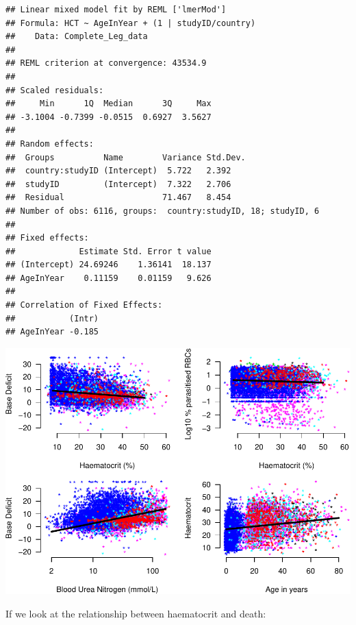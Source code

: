 \documentclass[]{article}
\newenvironment{Shaded}{\begin{snugshade}}{\end{snugshade}}
\newcommand{\KeywordTok}[1]{\textcolor[rgb]{0.13,0.29,0.53}{\textbf{#1}}}
\newcommand{\DataTypeTok}[1]{\textcolor[rgb]{0.13,0.29,0.53}{#1}}
\newcommand{\DecValTok}[1]{\textcolor[rgb]{0.00,0.00,0.81}{#1}}
\newcommand{\StringTok}[1]{\textcolor[rgb]{0.31,0.60,0.02}{#1}}
\newcommand{\OperatorTok}[1]{\textcolor[rgb]{0.81,0.36,0.00}{\textbf{#1}}}
\newcommand{\NormalTok}[1]{#1}
\begin{document}
\begin{verbatim}
## Linear mixed model fit by REML ['lmerMod']
## Formula: HCT ~ AgeInYear + (1 | studyID/country)
##    Data: Complete_Leg_data
## 
## REML criterion at convergence: 43534.9
## 
## Scaled residuals: 
##     Min      1Q  Median      3Q     Max 
## -3.1004 -0.7399 -0.0515  0.6927  3.5627 
## 
## Random effects:
##  Groups          Name        Variance Std.Dev.
##  country:studyID (Intercept)  5.722   2.392   
##  studyID         (Intercept)  7.322   2.706   
##  Residual                    71.467   8.454   
## Number of obs: 6116, groups:  country:studyID, 18; studyID, 6
## 
## Fixed effects:
##             Estimate Std. Error t value
## (Intercept) 24.69246    1.36141  18.137
## AgeInYear    0.11159    0.01159   9.626
## 
## Correlation of Fixed Effects:
##           (Intr)
## AgeInYear -0.185
\end{verbatim}

\includegraphics{LegacyAnalysis_files/figure-latex/ExploratoryPlots-1.pdf}

If we look at the relationship between haematocrit and death:

\begin{Shaded}
\end{Shaded}
\end{document}
